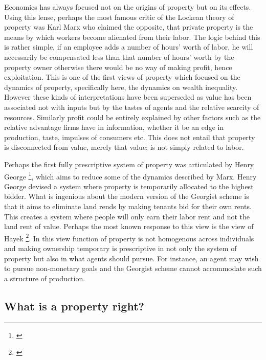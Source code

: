 \documentclass[12pt]{article}
\numberwithin{equation}{section}
\begin{document}
Economics has always focused not on the origins of property but on its effects. Using this lense, perhaps the most famous critic of the Lockean theory of property was Karl Marx who claimed the opposite, that private property is the means by which workers become alienated from their labor. The logic behind this is rather simple, if an employee adds a number of hours’ worth of labor, he will necessarily be compensated less than that number of hours’ worth by the property owner otherwise there would be no way of making profit, hence exploitation. This is one of the first views of property which focused on the dynamics of property, specifically here, the dynamics on wealth inequality. However these kinds of interpretations have been superseded as value has been associated not with inputs but by the tastes of agents and the relative scarcity of resources. Similarly profit could be entirely explained by other factors such as the relative advantage firms have in information, whether it be an edge in production, taste, impulses of consumers etc. This does not entail that property is disconnected from value, merely that value; is not simply related to labor.

Perhaps the first fully prescriptive system of property was articulated by Henry George \footnote{\cite{progress}}, which aims to reduce some of the dynamics described by Marx. Henry George devised a system where property is temporarily allocated to the highest bidder. What is ingenious about the modern version of the Georgist scheme is that it aims to eliminate land rends by making tenants bid for their own rents. This creates a system where people will only earn their labor rent and not the land rent of value. Perhaps the most known response to this view is the view of Hayek \footnote{\cite{Fatal}}. In this view function of property is not homogenous across individuals and making ownership temporary is prescriptive in not only the system of property but also in what agents should pursue. For instance, an agent may wish to pursue non-monetary goals and the Georgist scheme cannot accommodate such a structure of production.


\newpage


\subsection{What is a property right?}
\end{document}
